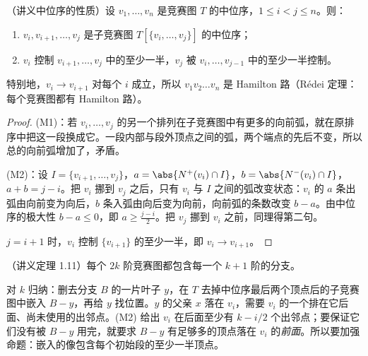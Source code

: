 \begin{proposition}\label{prop:orderings:median}
（讲义中位序的性质）设 $v_1,\dots,v_n$ 是竞赛图 $T$ 的中位序，$1\leqslant i<j\leqslant n$。则：
\begin{enumerate}
\item[(M1)] $v_i,v_{i+1},\dots,v_j$ 是子竞赛图 $T[\{v_i,\dots,v_j\}]$ 的中位序；
\item[(M2)] $v_i$ 控制 $v_{i+1},\dots,v_j$ 中的至少一半，$v_j$ 被 $v_i,\dots,v_{j-1}$ 中的至少一半控制。
\end{enumerate}
特别地，$v_i\to v_{i+1}$ 对每个 $i$ 成立，所以 $v_1v_2\dots v_n$ 是 Hamilton 路（Rédei 定理：每个竞赛图都有 Hamilton 路）。
\end{proposition}
\begin{proof}
(M1)：若 $v_i,\dots,v_j$ 的另一个排列在子竞赛图中有更多的向前弧，就在原排序中把这一段换成它。一段内部与段外顶点之间的弧，两个端点的先后不变，所以总的向前弧增加了，矛盾。

(M2)：设 $I=\{v_{i+1},\dots,v_j\}$，$a=\abs{N^+(v_i)\cap I}$，$b=\abs{N^-(v_i)\cap I}$，$a+b=j-i$。把 $v_i$ 挪到 $v_j$ 之后，只有 $v_i$ 与 $I$ 之间的弧改变状态：$v_i$ 的 $a$ 条出弧由向前变为向后，$b$ 条入弧由向后变为向前，向前弧的条数改变 $b-a$。由中位序的极大性 $b-a\leqslant0$，即 $a\geqslant\frac{j-i}2$。把 $v_j$ 挪到 $v_i$ 之前，同理得第二句。

$j=i+1$ 时，$v_i$ 控制 $\{v_{i+1}\}$ 的至少一半，即 $v_i\to v_{i+1}$。
\end{proof}

\begin{theorem}\label{thm:orderings:havet-thomasse}
（讲义定理 1.11）每个 $2k$ 阶竞赛图都包含每一个 $k+1$ 阶的分支。
\end{theorem}

\begin{remark}[证明思路]
对 $k$ 归纳：删去分支 $B$ 的一片叶子 $y$，在 $T$ 去掉中位序最后两个顶点后的子竞赛图中嵌入 $B-y$，再给 $y$ 找位置。$y$ 的父亲 $x$ 落在 $v_i$，需要 $v_i$ 的一个排在它后面、尚未使用的出邻点。(M2) 给出 $v_i$ 在后面至少有 $k-i/2$ 个出邻点；要保证它们没有被 $B-y$ 用完，就要求 $B-y$ 有足够多的顶点落在 $v_i$ 的\emph{前面}。所以要加强命题：嵌入的像包含每个初始段的至少一半顶点。
\end{remark}

